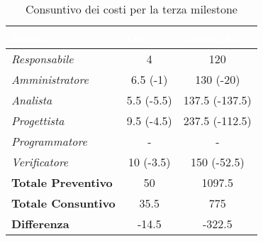 \begin{table}[H]
    \renewcommand\arraystretch{1.5}
    \centering
    \begin{tabular}{|l|c|c|}
    \hline
    \rowcolor[HTML]{036400}
    \textcolor{white}{\textbf{Ruolo}} & \multicolumn{1}{l|}{\textcolor{white}{\textbf{Ore}}} & \multicolumn{1}{l|}{\textcolor{white}{\textbf{Costo (€)}}} \\ \hline
    \rowcolor[HTML]{EFEFEF}\textit{Responsabile}      & 4           & 120            \\ \hline
    \rowcolor[HTML]{C0C0C0}\textit{Amministratore}    & 6.5 (-1)    & 130 (-20)      \\ \hline
    \rowcolor[HTML]{EFEFEF}\textit{Analista}          & 5.5 (-5.5)   & 137.5 (-137.5)   \\ \hline
    \rowcolor[HTML]{C0C0C0}\textit{Progettista}       & 9.5 (-4.5)   & 237.5 (-112.5)   \\ \hline
    \rowcolor[HTML]{EFEFEF}\textit{Programmatore}     & -           & -              \\ \hline
    \rowcolor[HTML]{C0C0C0}\textit{Verificatore}      & 10 (-3.5) & 150 (-52.5)  \\ \hline
    \rowcolor[HTML]{EFEFEF}\textbf{Totale Preventivo} & 50          & 1097.5         \\ \hline
    \rowcolor[HTML]{C0C0C0}\textbf{Totale Consuntivo} & 35.5        & 775            \\ \hline
    \rowcolor[HTML]{EFEFEF}\textbf{Differenza}        & -14.5       & -322.5         \\ \hline
    \end{tabular}
    \caption{Consuntivo dei costi per la terza milestone}
\end{table}

